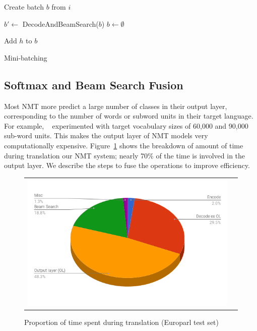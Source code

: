 \documentclass[11pt,a4paper]{article}
\begin{document}
\begin{algorithm}
\begin{algorithmic}

\State Create batch $b$ from $i$

  \State $b' \gets$ DecodeAndBeamSearch($b$)
  \State $b \gets \emptyset$
  
      \State Add $h$ to $b$
    \EndIf
  \EndFor
\EndWhile

\EndProcedure

\end{algorithmic}
\caption{Mini-batching}
\label{algo:Mini-batching}
\end{algorithm}


\subsection{Softmax and Beam Search Fusion}

Most NMT more predict a large number of classes in their output layer, corresponding to the number of words or subword units in their target language. For example, ~\citet{sennrich-haddow-birch:2016:P16-12} experimented with target vocabulary sizes of 60,000 and 90,000 sub-word units. This makes the output layer of NMT models very computationally expensive. Figure~\ref{fig:pie-time-europarl} shows the breakdown of amount of time during translation our NMT system; nearly 70\% of the time is involved in the output layer. We describe the steps to fuse the operations to improve efficiency.
\begin{figure}
\centering
\begin{tabular}{cc}
{\includegraphics[scale=0.3]{pie-time-europarl.png}} 
\end{tabular}
\caption{Proportion of time spent during translation (Europarl test set)}
\label{fig:pie-time-europarl}
\end{figure} 
\end{document}
